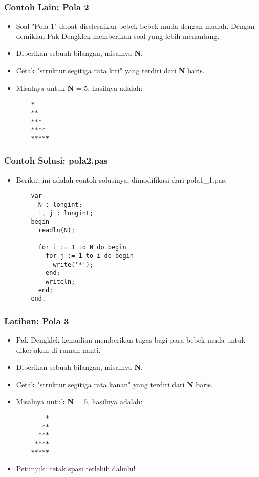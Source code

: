 \begin{frame}[fragile]
\frametitle{Contoh Lain: Pola 2}
\begin{itemize}
  \item Soal "Pola 1" dapat diselesaikan bebek-bebek muda dengan mudah. Dengan demikian Pak Dengklek memberikan soal yang lebih menantang.
  \item Diberikan sebuah bilangan, misalnya \textbf{N}.
  \item Cetak "struktur segitiga rata kiri" yang terdiri dari \textbf{N} baris.
  \item Misalnya untuk \textbf{N} = 5, hasilnya adalah:
  \begin{lstlisting}
    *
    **
    ***
    ****
    *****
  \end{lstlisting}
\end{itemize}
\end{frame}

\begin{frame}[fragile]
\frametitle{Contoh Solusi: pola2.pas}
\begin{itemize}
  \item Berikut ini adalah contoh solusinya, dimodifikasi dari pola1\_1.pas:
  \begin{lstlisting}
    var
      N : longint;
      i, j : longint;
    begin
      readln(N);

      for i := 1 to N do begin
        for j := 1 to i do begin
          write('*');
        end;
        writeln;
      end;
    end.
  \end{lstlisting}
\end{itemize}
\end{frame}

\begin{frame}[fragile]
\frametitle{Latihan: Pola 3}
\begin{itemize}
  \item Pak Dengklek kemudian memberikan tugas bagi para bebek muda untuk dikerjakan di rumah nanti.
  \item Diberikan sebuah bilangan, misalnya \textbf{N}.
  \item Cetak "struktur segitiga rata kanan" yang terdiri dari \textbf{N} baris.
  \item Misalnya untuk \textbf{N} = 5, hasilnya adalah:
  \begin{lstlisting}
        *
       **
      ***
     ****
    *****
  \end{lstlisting}
  \item Petunjuk: cetak spasi terlebih dahulu!
\end{itemize}
\end{frame}

